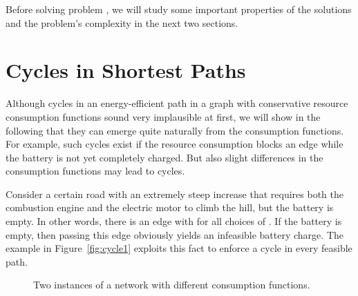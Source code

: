 \documentclass[a4paper]{scrartcl}
\begin{document}
Before solving problem , we will study some important properties of the solutions and the problem's complexity in the next two sections.


\section{Cycles in Shortest Paths}\label{sec:complexity}

Although cycles in an energy-efficient path in a graph with conservative resource consumption functions sound very implausible at first, we will show in the following that they can emerge quite naturally from the consumption functions. For example, such cycles exist if the resource consumption blocks an edge while the battery is not yet completely charged. But also slight differences in the consumption functions may lead to cycles.

Consider a certain road with an extremely steep increase that requires both the combustion engine and the electric motor to climb the hill, but the battery is empty. In other words, there is an edge  with  for all choices of . If the battery is empty, then passing this edge obviously yields an infeasible battery charge. The example in Figure~\ref{fig:cycle1} exploits this fact to enforce a cycle in every feasible path.

\begin{figure}[ht]\centering
{}\qquad
{}
\caption{Two instances of a network with different consumption functions.}\label{fig:cycle}
\end{figure}
\end{document}
